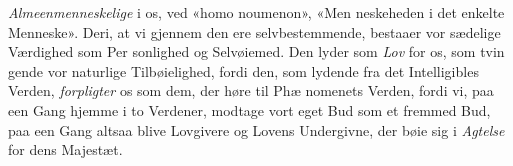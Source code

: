 \documentclass[12pt,a4paper]{book}
\begin{document}
\emph{Almeenmenneskelige} i os, ved «homo noumenon», «Men\-%
neskeheden i det enkelte Menneske». Deri, at vi gjennem den
ere selvbestemmende, bestaaer vor sædelige Værdighed som Per\-%
sonlighed og Selvøiemed. Den lyder som \emph{Lov} for os, som tvin\-%
gende vor naturlige Tilbøielighed, fordi den, som lydende fra det
Intelligibles Verden, \emph{forpligter} os som dem, der høre til Phæ\-%
nomenets Verden, fordi vi, paa een Gang hjemme i to Verdener,
modtage vort eget Bud som et fremmed Bud, paa een Gang
altsaa blive Lovgivere og Lovens Undergivne, der bøie sig i
\emph{Agtelse} for dens Majestæt.
\end{document}
